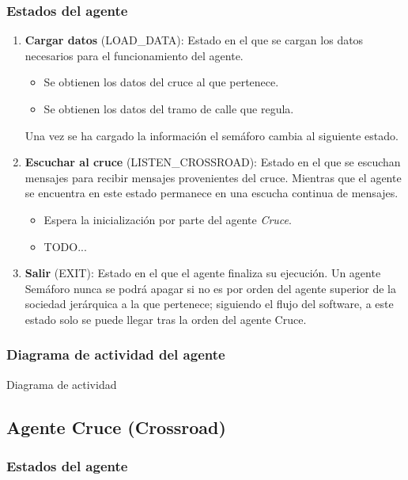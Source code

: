 \subsubsection{Estados del agente}
\begin{enumerate}
    \item \textbf{Cargar datos} \footnotesize(LOAD\_DATA)\normalsize: Estado en el que se cargan los datos necesarios para el funcionamiento del agente.
    \begin{itemize}
        \item Se obtienen los datos del cruce al que pertenece.
        \item Se obtienen los datos del tramo de calle que regula.
    \end{itemize}
    Una vez se ha cargado la información el semáforo cambia al siguiente estado.
    \item \textbf{Escuchar al cruce} \footnotesize(LISTEN\_CROSSROAD)\normalsize: Estado en el que se escuchan mensajes para recibir mensajes provenientes del cruce. Mientras que el agente se encuentra en este estado permanece en una escucha continua de mensajes.
    \begin{itemize}
        \item Espera la inicialización por parte del agente \textit{Cruce}.
        \item TODO...
    \end{itemize}
    \item \textbf{Salir} \footnotesize(EXIT)\normalsize: Estado en el que el agente finaliza su ejecución. Un agente Semáforo nunca se podrá apagar si no es por orden del agente superior de la sociedad jerárquica a la que pertenece; siguiendo el flujo del software, a este estado solo se puede llegar tras la orden del agente Cruce.
\end{enumerate}

\subsubsection{Diagrama de actividad del agente}
Diagrama de actividad

\subsection{Agente Cruce (Crossroad)}
\subsubsection{Estados del agente}


